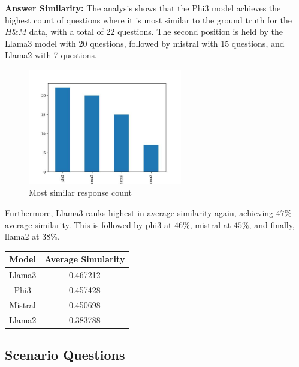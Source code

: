 \documentclass[]{article}
\begin{document}
\textbf{Answer Similarity:} 
The analysis shows that the Phi3 model achieves the highest count of questions where 
it is most similar to the ground truth for the $H\&M$ data, with a total of 22 questions. The second position is held by the Llama3 
model with 20 questions, followed by mistral with 15 questions, and Llama2 with 7 questions.

\begin{figure}[H]
    \centering
    \includegraphics[width=0.6\textwidth]{./images/highest_count_hm.jpg}
    \caption{Most similar response count}
    \label{fig:image_label}
\end{figure}

Furthermore, 
Llama3  ranks highest in average similarity again, 
achieving $47\%$ average similarity. This is followed by phi3 at $46\%$, mistral at $45\%$, and finally, 
llama2 at $38\%$.

\begin{center}
    \begin{tabular}{||c c||} 
     \hline
     \textbf{Model} & \textbf{Average Simularity}  \\ [0.5ex] 
     \hline
     Llama3 & 0.467212 \\ 
     \hline
     Phi3 & 0.457428  \\
     \hline
     Mistral & 0.450698 \\
     \hline
     Llama2 & 0.383788  \\
     \hline
    \end{tabular}
\end{center}

\subsection{Scenario Questions}
\end{document}
